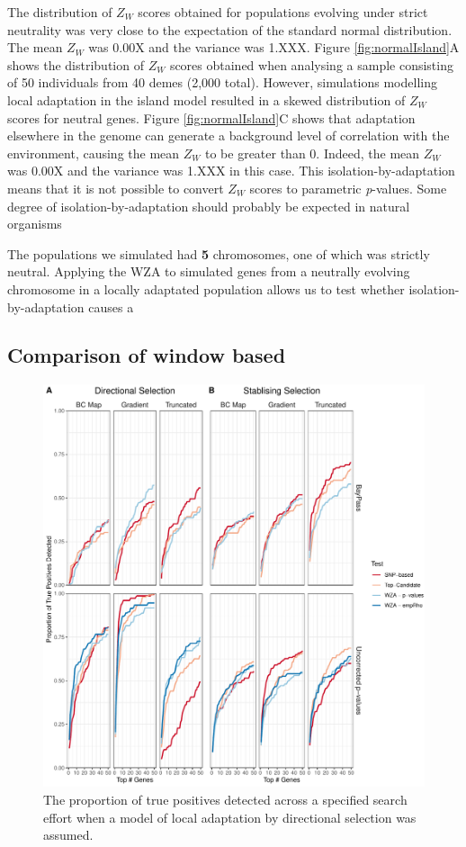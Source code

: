 \documentclass[11pt,twoside,lineno]{GSA_format}
\begin{document}
The distribution of $Z_W$ scores obtained for populations evolving under strict neutrality was very close to the expectation of the standard normal distribution. The mean $Z_W$ was 0.00X and the variance was 1.XXX. Figure \ref{fig:normalIsland}A shows the distribution of $Z_W$ scores obtained when analysing a sample consisting of 50 individuals from 40 demes (2,000 total).  However, simulations modelling local adaptation in the island model resulted in a skewed distribution of $Z_W$ scores for neutral genes. Figure \ref{fig:normalIsland}C shows that adaptation elsewhere in the genome can generate a background level of correlation with the environment, causing the mean $Z_W$ to be greater than 0. Indeed, the mean $Z_W$ was 0.00X and the variance was 1.XXX in this case. This isolation-by-adaptation means that it is not possible to convert $Z_W$ scores to parametric \textit{p}-values. 
Some degree of isolation-by-adaptation should probably be expected in natural organisms

The populations we simulated had \textbf{5} chromosomes, one of which was strictly neutral. Applying the WZA to simulated genes from a neutrally evolving chromosome in a locally adaptated population allows us to test whether isolation-by-adaptation causes a 



\subsection{Comparison of window based }


\begin{figure}[H]
  \includegraphics[width=\linewidth]{Plots/UncorrectedBayPassComparison_TruePositives.pdf} 
  \caption{The proportion of true positives detected across a specified search effort when a model of local adaptation  by directional selection was assumed.}

  \label{fig:truePosDirectional}
\end{figure}
\end{document}
